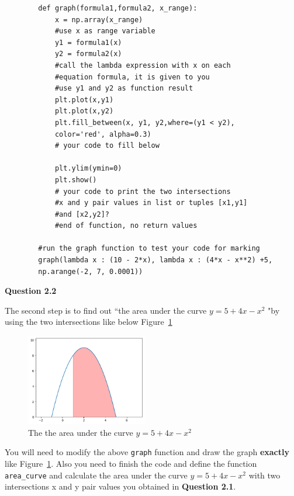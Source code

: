 \documentclass[a4paper]{article}
\begin{document}
\begin{answer}
    \begin{lstlisting}
        def graph(formula1,formula2, x_range):
            x = np.array(x_range)
            #use x as range variable
            y1 = formula1(x)
            y2 = formula2(x)
            #call the lambda expression with x on each
            #equation formula, it is given to you 
            #use y1 and y2 as function result
            plt.plot(x,y1)
            plt.plot(x,y2)
            plt.fill_between(x, y1, y2,where=(y1 < y2),
            color='red', alpha=0.3)
            # your code to fill below
            
            plt.ylim(ymin=0)
            plt.show()
            # your code to print the two intersections 
            #x and y pair values in list or tuples [x1,y1] 
            #and [x2,y2]?
            #end of function, no return values
            
        #run the graph function to test your code for marking 
        graph(lambda x : (10 - 2*x), lambda x : (4*x - x**2) +5,
        np.arange(-2, 7, 0.0001))
    \end{lstlisting}
    
    
    \textbf{Question 2.2}
    
    The second step is to find out ``the area under the curve  $y=5+4x-x^{2}$ "by using the two intersections like below Figure~\ref{fig:2.2q}

      \begin{figure}[H]
        \centering
        \includegraphics[height=4cm,keepaspectratio]{figure/2.2q.png}
        \caption{The the area under the curve $y=5+4x-x^{2}$}
        \label{fig:2.2q}
    \end{figure}
     You will need to modify the above \texttt{graph} function and draw the graph \textbf{exactly} like Figure~\ref{fig:2.2q}.
     Also you need to finish the code and define the function \texttt{area_curve} and calculate
     the area under the curve $y=5+4x-x^{2}$ with two intersections x and y 
     pair values you obtained in \textbf{Question 2.1}. \\


\end{answer}
\end{document}
